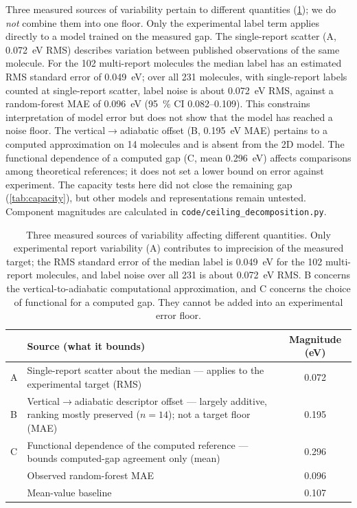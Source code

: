\documentclass[final,3p,times,twocolumn]{elsarticle}
\begin{document}
Three measured sources of variability pertain to different quantities
(\cref{tab:ceiling}); we do \emph{not} combine them into one floor. Only the
experimental label term applies directly to a model trained on the measured
gap. The single-report scatter (A, \qty{0.072}{\electronvolt} RMS) describes
variation between published observations of the same molecule. For the \num{102}
multi-report molecules the median label has an estimated RMS standard error of
\qty{0.049}{\electronvolt}; over all \num{231} molecules, with single-report labels
counted at single-report scatter, label noise is about \qty{0.072}{\electronvolt} RMS,
against a random-forest MAE of \qty{0.096}{\electronvolt} (\qty{95}{\percent} CI
\numrange{0.082}{0.109}). This constrains interpretation of model error but
does not show that the model has reached a noise floor. The
vertical$\rightarrow$adiabatic offset (B, \qty{0.195}{\electronvolt} MAE)
pertains to a computed approximation on \num{14} molecules and is absent
from the 2D model. The functional dependence of a computed gap (C, mean
\qty{0.296}{\electronvolt}) affects comparisons among theoretical
references; it does not set a lower bound on error against experiment. The
capacity tests here did not close the remaining gap
(\cref{tab:capacity}), but other models and representations remain untested.
Component magnitudes are calculated in
\texttt{code/ceiling\_decomposition.py}.

\begin{table}[t]
  \centering
  \caption{Three measured sources of variability affecting different
    quantities. Only experimental report variability (A) contributes to
    imprecision of the measured target; the RMS standard error of the median
    label is \qty{0.049}{\electronvolt} for the \num{102} multi-report molecules,
    and label noise over all \num{231} is about \qty{0.072}{\electronvolt} RMS. B concerns the
    vertical-to-adiabatic computational approximation, and C concerns
    the choice of functional for a computed gap. They cannot be added into
    an experimental error floor.}
  \label{tab:ceiling}
  \small
  \begin{tabular}{p{}p{}c}
    \toprule
    & Source (what it bounds) & Magnitude (eV) \\
    \midrule
    A & Single-report scatter about the median --- applies to the experimental target (RMS) & 0.072 \\
    B & Vertical$\rightarrow$adiabatic descriptor offset --- largely additive, ranking mostly preserved ($n = 14$); not a target floor (MAE) & 0.195 \\
    C & Functional dependence of the computed reference --- bounds computed-gap agreement only (mean) & 0.296 \\
    \midrule
    & Observed random-forest MAE & 0.096 \\
    & Mean-value baseline & 0.107 \\
    \bottomrule
  \end{tabular}
\end{table}
\end{document}

